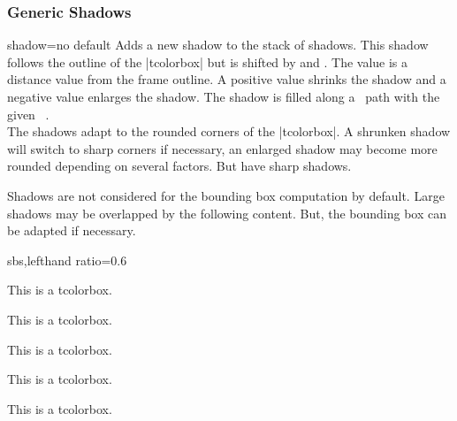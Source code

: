\clearpage

\subsubsection{Generic Shadows}
\begin{docTcbKey}{shadow}{=}{no default}
  Adds a new shadow to the stack of shadows.
  This shadow follows the outline of the |tcolorbox| but is shifted by
   and . The  value is a distance value
  from the frame outline.  A positive  value shrinks the shadow
  and a negative  value enlarges the shadow.
  The shadow is filled along a \tikzname\  path with the given \tikzname\  .\\
  The shadows adapt to the rounded corners of the |tcolorbox|. A shrunken shadow
  will switch to sharp corners if necessary, an enlarged shadow may become
  more rounded depending on several factors. But 
  have sharp shadows.
  \begin{marker}
  Shadows are not considered for the bounding box computation by default.
  Large shadows may be overlapped by the following content. But, the
  bounding box can be adapted if necessary.
  \end{marker}

\begin{dispExample*}{sbs,lefthand ratio=0.6}

\begin{tcolorbox}[title=My own shadow,
  shadow={2mm}{-1mm}{0mm}{black!50!white}]
This is a tcolorbox.
\end{tcolorbox}
\par\bigskip
\begin{tcolorbox}[title=Another shadow,
  shadow={-1mm}{-2mm}{0mm}{fill=blue,
    opacity=0.5}]
This is a tcolorbox.
\end{tcolorbox}
\par\bigskip
\begin{tcolorbox}[title=Double shadow,
  shadow={-1.5mm}{-1.5mm}{0mm}{fill=blue,
    opacity=0.25},
  shadow={1.5mm}{-1.5mm}{0mm}{fill=red,
    opacity=0.25}]
This is a tcolorbox.
\end{tcolorbox}
\par\bigskip
\begin{tcolorbox}[title=Far shadow,
  shadow={5.5mm}{-3.5mm}{2mm}{fill=black,
    opacity=0.25}]
This is a tcolorbox.
\end{tcolorbox}
\par\bigskip\bigskip
\begin{tcolorbox}[title=Halo shadow,
  shadow={0mm}{0mm}{-1.5mm}%
     {fill=yellow!75!red,opacity=0.5}]
This is a tcolorbox.
\end{tcolorbox}
\end{dispExample*}
\end{docTcbKey}

